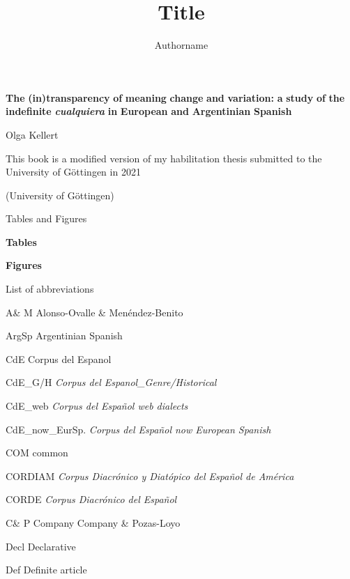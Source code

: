 \documentclass[output=paper]{langscibook}
\author{Authorname\orcid{}\affiliation{}}
\title{Title}
\begin{document}
\maketitle 


\textbf{The} \textbf{(in)transparency} \textbf{of} \textbf{meaning} \textbf{change} \textbf{and} \textbf{variation:} \textbf{a} \textbf{study} \textbf{of} \textbf{the} \textbf{indefinite} \textbf{\textit{cualquiera}} \textbf{in} \textbf{European} \textbf{and} \textbf{Argentinian} \textbf{Spanish}

Olga Kellert

This book is a modified version of my habilitation thesis submitted to the University of Göttingen in 2021

(University of Göttingen)

\begin{styleContentsHeading}
Tables and Figures
\end{styleContentsHeading}

\begin{styleelenconumeratoii}
\textbf{Tables}
\end{styleelenconumeratoii}

\begin{styleelenconumeratoii}
\textbf{Figures}
\end{styleelenconumeratoii}

\begin{styleContentsHeading}
List of abbreviations
\end{styleContentsHeading}

A\& M   Alonso-Ovalle \& Menéndez-Benito

ArgSp  Argentinian Spanish

CdE     Corpus del Espanol

CdE\_G/H  \textit{Corpus del Espanol\_Genre/Historical}

CdE\_web \textit{Corpus del Español web dialects}

CdE\_now\_EurSp.  \textit{Corpus del Español now European Spanish}

COM   common

CORDIAM   \textit{Corpus Diacrónico y Diatópico del Español de América}

CORDE   \textit{Corpus Diacrónico del Español}

C\& P    Company Company \& Pozas-Loyo

Decl    Declarative

Def    Definite article
\end{document}
